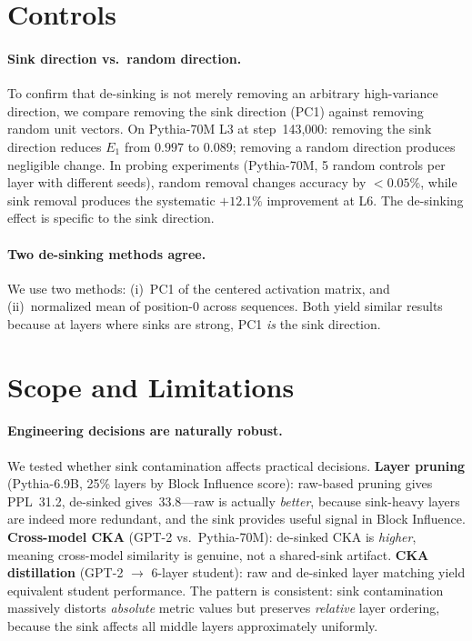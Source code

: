 \documentclass[11pt]{article}
\begin{document}
\section{Controls}\label{sec:controls}

\paragraph{Sink direction vs.\ random direction.}
To confirm that de-sinking is not merely removing an arbitrary high-variance direction, we compare removing the sink direction (PC1) against removing random unit vectors. On Pythia-70M L3 at step~143{,}000: removing the sink direction reduces $E_1$ from $0.997$ to $0.089$; removing a random direction produces negligible change. In probing experiments (Pythia-70M, 5 random controls per layer with different seeds), random removal changes accuracy by $< 0.05\%$, while sink removal produces the systematic $+12.1\%$ improvement at L6. The de-sinking effect is specific to the sink direction.

\paragraph{Two de-sinking methods agree.}
We use two methods: (i)~PC1 of the centered activation matrix, and (ii)~normalized mean of position-0 across sequences. Both yield similar results because at layers where sinks are strong, PC1 \emph{is} the sink direction.

\section{Scope and Limitations}\label{sec:limits}

\paragraph{Engineering decisions are naturally robust.}
We tested whether sink contamination affects practical decisions. \textbf{Layer pruning} (Pythia-6.9B, 25\% layers by Block Influence score): raw-based pruning gives PPL~31.2, de-sinked gives~33.8---raw is actually \emph{better}, because sink-heavy layers are indeed more redundant, and the sink provides useful signal in Block Influence. \textbf{Cross-model CKA} (GPT-2 vs.\ Pythia-70M): de-sinked CKA is \emph{higher}, meaning cross-model similarity is genuine, not a shared-sink artifact. \textbf{CKA distillation} (GPT-2 $\to$ 6-layer student): raw and de-sinked layer matching yield equivalent student performance. The pattern is consistent: sink contamination massively distorts \emph{absolute} metric values but preserves \emph{relative} layer ordering, because the sink affects all middle layers approximately uniformly.
\end{document}
